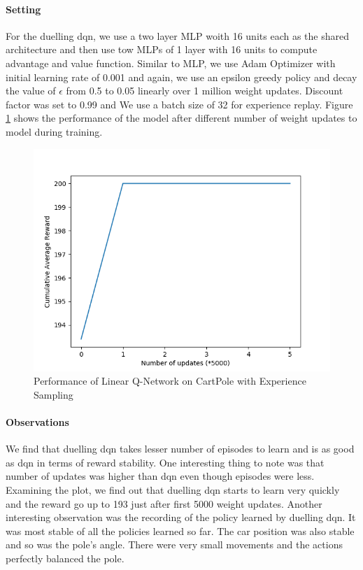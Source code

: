 \documentclass[12pt]{article}
\begin{document}
\paragraph{Setting} For the duelling dqn, we use a two layer MLP woith 16 units each as the shared architecture and then use tow MLPs of 1 layer with 16 units to compute advantage and value function. Similar to MLP, we use Adam Optimizer with initial learning rate of 0.001 and again, we use an epsilon greedy policy and decay the value of $\epsilon$ from 0.5 to 0.05 linearly over 1 million weight updates. Discount factor was set to 0.99 and We use a batch size of 32 for experience replay. Figure \ref{fig:05} shows the performance of the model after different number of weight updates to model during training.
\begin{figure}[h]
  \centering
  \vspace{-5mm}
  \includegraphics[width=0.8\linewidth]{figures/reward_plot_05.png}
  \caption{Performance of Linear Q-Network on CartPole with Experience Sampling}
  \label{fig:05}
\end{figure}
\paragraph{Observations} We find that duelling dqn takes lesser number of episodes to learn and is as good as dqn in terms of reward stability. One interesting thing to note was that number of updates was higher than dqn even though episodes were less. Examining the plot, we find out that duelling dqn starts to learn very quickly and the reward go up to 193 just after first 5000 weight updates. Another interesting observation was the recording of the policy learned by duelling dqn. It was most stable of all the policies learned so far. The car position was also stable and so was the pole's angle. There were very small movements and the actions perfectly balanced the pole. 
\end{document}
